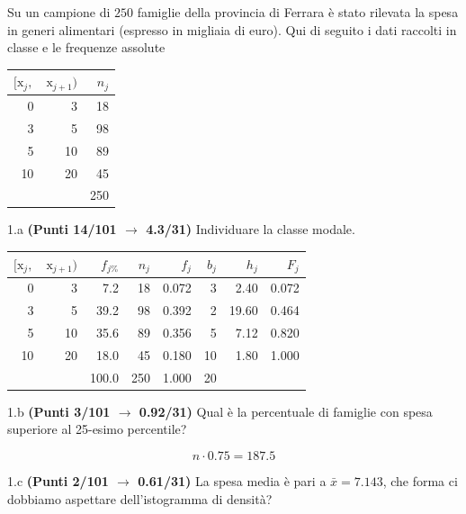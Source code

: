 \documentclass[
  11pt,
]{book}
\theoremstyle{mytheoremstyle}
\theoremstyle{mydefstyle}
\newenvironment{sol}
  {
  \begin{tcolorbox}[enhanced,breakable,arc=0.1mm,boxrule=1pt,colback=white,colframe=iblue,
  title=\bf \fontfamily{lmss}\selectfont \hspace{.5 cm} Soluzione,drop fuzzy shadow]

}{
\end{tcolorbox}
  }
\begin{document}
Su un campione di \(250\) famiglie della provincia di Ferrara è stato rilevata la spesa in generi alimentari (espresso in migliaia di euro). Qui di seguito i dati raccolti in classe e le frequenze assolute

\begin{table}[H]
\centering
\begin{tabular}{rrr}
\toprule
$[\text{x}_j,$ & $\text{x}_{j+1})$ & $n_j$\\
\midrule
0 & 3 & 18\\
3 & 5 & 98\\
5 & 10 & 89\\
10 & 20 & 45\\
 &  & 250\\
\bottomrule
\end{tabular}
\end{table}

1.a \textbf{(Punti 14/101 \(\rightarrow\) 4.3/31)} Individuare la classe modale.

\begin{sol}

\begin{table}[H]
\centering
\begin{tabular}{rrrrrrrr}
\toprule
$[\text{x}_j,$ & $\text{x}_{j+1})$ & $f_{j\%}$ & $n_j$ & $f_j$ & $b_j$ & $h_j$ & $F_j$\\
\midrule
0 & 3 & 7.2 & 18 & 0.072 & 3 & 2.40 & 0.072\\
3 & 5 & 39.2 & 98 & 0.392 & 2 & 19.60 & 0.464\\
5 & 10 & 35.6 & 89 & 0.356 & 5 & 7.12 & 0.820\\
10 & 20 & 18.0 & 45 & 0.180 & 10 & 1.80 & 1.000\\
 &  & 100.0 & 250 & 1.000 & 20 &  & \\
\bottomrule
\end{tabular}
\end{table}

\end{sol}

1.b \textbf{(Punti 3/101 \(\rightarrow\) 0.92/31)} Qual è la percentuale di famiglie con spesa superiore al 25-esimo percentile?

\begin{sol}
\[n\cdot 0.75=187.5\]

\end{sol}

1.c \textbf{(Punti 2/101 \(\rightarrow\) 0.61/31)} La spesa media è pari a \(\bar x=7.143\), che forma ci dobbiamo aspettare dell'istogramma di densità?
\end{document}
